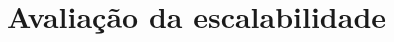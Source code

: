
\section{Avaliação da escalabilidade}
\begin{frame}\justifying
\end{frame}

\begin{frame}\justifying
    \begin{figure}
        \centering
        \label{fig:cluster}
    \end{figure}
\end{frame}

